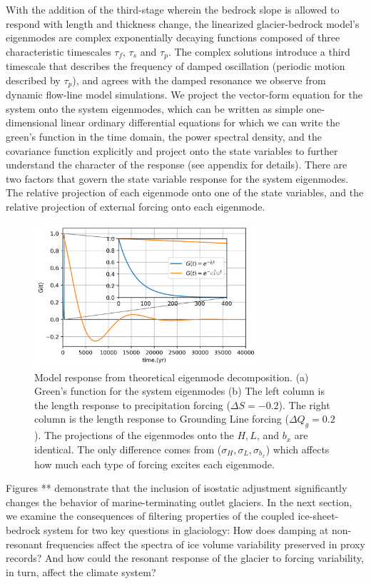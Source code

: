 \documentclass[tc, manuscript]{copernicus}
\begin{document}
With the addition of the third-stage wherein the bedrock slope is allowed to respond with length and thickness change, the linearized glacier-bedrock model's eigenmodes are complex exponentially decaying functions composed of three characteristic timescales $\tau_f$, $\tau_s$ and $\tau_p$. The complex solutions introduce a third timescale that describes the frequency of damped oscillation (periodic motion described by $\tau_p$), and agrees with the damped resonance we observe from dynamic flow-line model simulations. We project the vector-form equation for the system onto the system eigenmodes, which can be written as simple one-dimensional linear ordinary differential equations for which we can write the green's function in the time domain, the power spectral density, and the covariance function explicitly and project onto the state variables to further understand the character of the response (see appendix for details). There are two factors that govern the state variable response for the system eigenmodes. The relative projection of each eigenmode onto one of the state variables, and the relative projection of external forcing onto each eigenmode.


\begin{figure}[t]
\includegraphics[width=8.3cm]{../figures/greens_function.png}
\caption{Model response from theoretical eigenmode decomposition. (a) Green's function for the system eigenmodes (b)
The left column is the length response to precipitation forcing ($\Delta S = −0.2$). 
The right column is the length response to Grounding Line forcing ($\Delta Q_g = 0.2$).
The projections of the eigenmodes onto the $H, L$, and $b_x$ are identical. The only difference comes from ($\sigma_H, \sigma_L, \sigma_{b_x}$) which affects how much each type of forcing excites each eigenmode.}
\end{figure}



Figures ** demonstrate that the inclusion of isostatic adjustment significantly changes the behavior of marine-terminating outlet glaciers. 
In the next section, we examine the consequences of filtering properties of the coupled ice-sheet-bedrock system for two key questions in glaciology: 
How does damping at non-resonant frequencies affect the spectra of ice volume variability preserved in proxy records?
And how could the resonant response of the glacier to forcing variability, in turn, affect the climate system?
\end{document}
